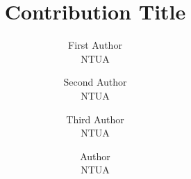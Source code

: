 \documentclass{article}
\begin{document}
\title{Contribution Title}

\author{
  First Author \\ NTUA
  \and
  Second Author \\ NTUA
  \and
  Third Author \\ NTUA
  \and
  Author \\ NTUA
}


\maketitle

\begin{abstract}
  
\end{abstract}

\setcounter{page}{0}
\thispagestyle{empty}
\newpage








\clearpage
\appendix



%



\end{document}
